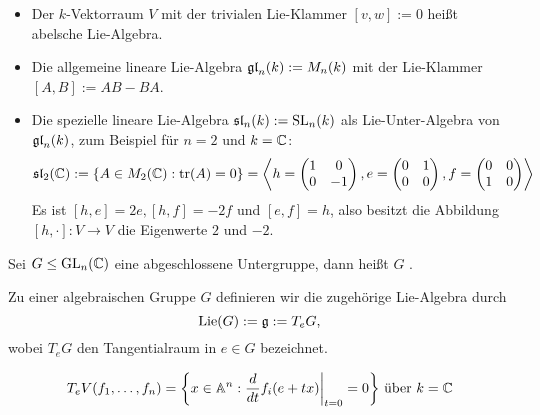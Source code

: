 	\begin{itemize}
		\item Der $k$-Vektorraum $V$ mit der trivialen Lie-Klammer $[v,w] := 0$ heißt abelsche Lie-Algebra.
		\item Die allgemeine lineare Lie-Algebra $\gl_n(k) := M_n(k)$ mit der Lie-Klammer $[A,B] := AB-BA$.
		\item Die spezielle lineare Lie-Algebra $\slie_n(k) := \SL_n(k)$ als Lie-Unter-Algebra von $\gl_n(k)$, zum Beispiel für $n=2$ und $k = \CC$:
		\[\slie_2(\CC) := \{A \in M_2(\CC) : \tr(A) = 0 \} = \sprod*{
			h = \begin{pmatrix} 1 & 0 \\ 0 & -1	\end{pmatrix},
			e = \begin{pmatrix}	0 & 1 \\ 0 & 0 \end{pmatrix},
			f = \begin{pmatrix}	0 & 0 \\ 1 & 0 \end{pmatrix}} \]
		Es ist $[h,e] = 2e, [h,f] = -2f$ und $[e,f] = h$, also besitzt die Abbildung $[h,\cdot]\colon V \rightarrow V$ die Eigenwerte $2$ und $-2$.
	\end{itemize}
	
\begin{defn}\label{1.5}
	Sei $G \leq \GL_n(\CC)$ eine abgeschlossene Untergruppe, dann heißt $G$ .
\end{defn}

\begin{center}
\end{center}
	
	Zu einer algebraischen Gruppe $G$ definieren wir die zugehörige Lie-Algebra durch
	\[ \Lie(G) := \g := T_eG, \]
	wobei $T_eG$ den Tangentialraum in $e \in G$ bezeichnet.
	
	\[ T_eV(f_1,\dots,f_n) = \penbrace*{x \in \aff^n : \frac{d}{dt} f_i(e+tx) \bigg|_{t=0} = 0} \text{ über } k = \CC \]
	
